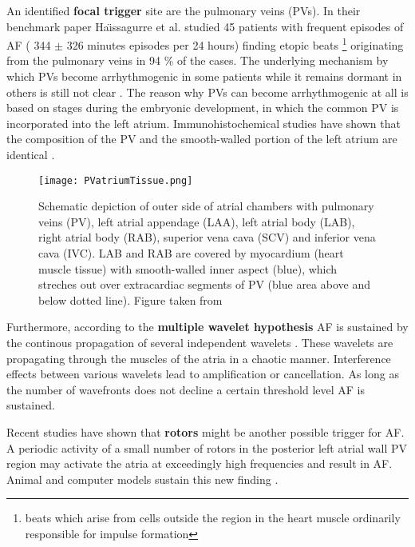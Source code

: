 \documentclass[type=dr, dr=rernat, accentcolor=tud7b,colorbacktitle, bigchapter, openright, twoside, 12pt ]{tudthesis}
\begin{document}
An identified \textbf{focal trigger} site are the pulmonary veins (PVs). In their benchmark paper Ha\"{\i}ssagurre et al. \cite{Hai98} studied 
45 patients with frequent episodes of AF ( 344 $\pm$ 326 minutes episodes per 24 hours) finding etopic beats \footnote{beats which arise 
from cells outside the region in the heart muscle ordinarily responsible for impulse formation} originating from the pulmonary veins in 
94 \% of the cases. The underlying mechanism by which PVs become arrhythmogenic in some patients while it remains dormant in others is 
still not clear \cite{CE09}. The reason why PVs can become arrhythmogenic at all is based on stages during the embryonic development, in 
which the common PV is incorporated into the left atrium. Immunohistochemical studies have shown that the composition of the PV and the 
smooth-walled portion of the left atrium are identical \cite{CE09} \cite{Dou06}. 

\begin{figure}[H]
\begin{center}
\texttt{[image: PVatriumTissue.png]}
\caption{Schematic depiction of outer side of atrial chambers with pulmonary veins (PV), left atrial appendage (LAA), left atrial body (LAB), 
right atrial body (RAB), superior vena cava (SCV) and inferior vena cava (IVC). LAB and RAB are covered by myocardium (heart muscle tissue) 
with smooth-walled inner aspect (blue), which streches out over extracardiac segments of PV (blue area above and below dotted line). Figure 
taken from \cite{Dou06}}
\end{center}
\end{figure}

Furthermore, according to the \textbf{multiple wavelet hypothesis} AF is sustained by the continous propagation of  several independent 
wavelets \cite{CE09}. These wavelets are propagating through the muscles of the atria in a chaotic manner. Interference effects between 
various wavelets lead to amplification or cancellation. As long as the number of wavefronts does not decline a certain threshold level AF 
is sustained.\newline

Recent studies have shown that \textbf{rotors} might be another possible trigger for AF. A periodic activity of a small number of rotors in 
the posterior left atrial wall PV region may activate the atria at exceedingly high frequencies and result in AF. Animal and computer 
models sustain this new finding \cite{Jal03}. \newline
\end{document}
